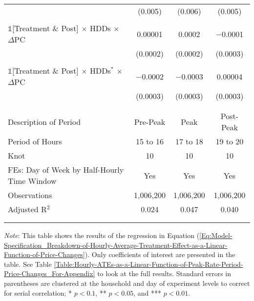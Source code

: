 {\begin{table}[t!]
\begin{adjustbox}{scale = 0.9}
\begin{threeparttable}
\begin{tabular}{@{\extracolsep{40pt}}lccc}
                    & (0.005) & (0.006) & (0.005) \\
                    & & & \\
                    $\mathbb{1}$[Treatment \& Post] $\times$ HDDs $\times$ $\Delta$PC & 0.00001 & 0.0002 & $-$0.0001 \\
                    & (0.0002) & (0.0002) & (0.0003) \\
                    & & & \\
                    $\mathbb{1}$[Treatment \& Post] $\times$ HDDs$^{*}$ $\times$ $\Delta$PC & $-$0.0002 & $-$0.0003 & 0.00004 \\
                    & (0.0003) & (0.0003) & (0.0003) \\
                    & & & \\
                    \hline
                    \\[-2.0ex]
                    Description of Period & Pre-Peak & Peak & Post-Peak \\
                    Period of Hours & 15 to 16 & 17 to 18 & 19 to 20 \\
                    Knot & 10 & 10 & 10 \\
                    FEs: Day of Week by Half-Hourly Time Window & Yes & Yes & Yes \\
                    Observations & 1,006,200 & 1,006,200 & 1,006,200 \\
                    Adjusted R$^{2}$ & 0.024 & 0.047 & 0.040 \\
                    \\[-2.0ex]
                    \hline \hline
                    \\[-4.5ex]
                \end{tabular}
                \begin{tablenotes}[flushleft]
                    \footnotesize
                    \item \textit{Note}: This table shows the results of the regression in Equation (\ref{Eq:Model-Specification_Breakdown-of-Hourly-Average-Treatment-Effect-as-a-Linear-Function-of-Price-Changes}). Only coefficients of interest are presented in the table. See Table \ref{Table:Hourly-ATEs-as-a-Linear-Function-of-Peak-Rate-Period-Price-Changes_For-Appendix} to look at the full results. Standard errors in parentheses are clustered at the household and day of experiment levels to correct for serial correlation; * $p < 0.1$, ** $p < 0.05$, and *** $p < 0.01$.
                \end{tablenotes}
            \end{threeparttable}
        \end{adjustbox}
    \end{table}
}
